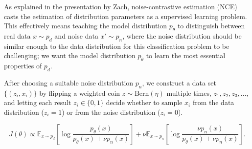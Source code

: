 \documentclass[a4paper]{article}
\theoremstyle{definition}
\theoremstyle{plain}
\begin{document}
As explained in the presentation by Zach, noise-contrastive estimation (NCE) casts the estimation of distribution parameters as a supervised learning problem. This effectively means teaching the model distribution $p_\theta$ to distinguish between real data $x \sim p_d$ and noise data $x' \sim p_n$, where the noise distribution should be similar enough to the data distribution for this classification problem to be challenging; we want the model distribution $p_\theta$ to learn  the most essential properties of $p_d$.

After choosing a suitable noise distribution $p_n$, we construct a data set $\{(z_i,x_i)\}$ by flipping a weighted coin $z \sim \text{Bern}(\eta)$ multiple times, $z_1,z_2,z_3,\ldots$, and letting each result $z_i \in \{0,1\}$ decide whether to sample $x_i$ from the data distribution ($z_i = 1$) or from the noise distribution ($z_i = 0$).

\begin{equation}\label{J_function}
J(\theta) \propto \mathbb{E}_{x \sim p_d} \left[ \log \frac{p_\theta(x)}{p_\theta(x) + \nu p_n(x)}\right] + \nu \mathbb{E}_{x \sim p_n} \left[ \log \frac{ \nu p_n(x)}{p_\theta(x) + \nu p_n(x)}\right].
\end{equation}
\end{document}
